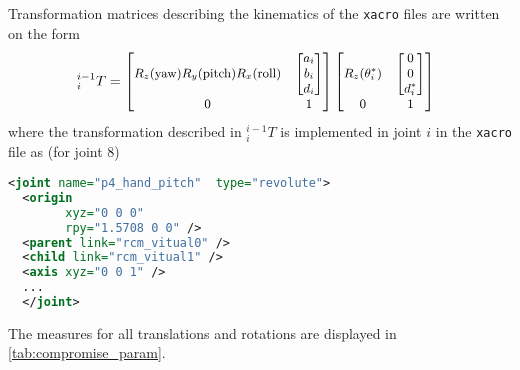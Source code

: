 Transformation matrices describing the kinematics of the \texttt{xacro} files are written on the form
\begin{equation}
\hspace*{-2mm}
\small
^{i-1}_i T =
\begin{bmatrix}
R_z(\text{yaw})R_y(\text{pitch})R_x(\text{roll}) & \begin{bmatrix}a_i\\ b_i\\ d_i\end{bmatrix}\\
0 & 1
\end{bmatrix}
\begin{bmatrix}
R_z(\theta_i^*) & \begin{bmatrix}0\\ 0\\ d_i^* \end{bmatrix}\\
0 & 1
\end{bmatrix}
\label{eq:xacro_transformation}
\end{equation}
where the transformation described in $^{i-1}_i T$ is implemented in joint $i$ in the \texttt{xacro} file  as (for joint 8)
\begin{lstlisting}[language=xml]
  <joint name="p4_hand_pitch"  type="revolute">
  <origin
  		xyz="0 0 0"
  		rpy="1.5708 0 0" />
  <parent link="rcm_vitual0" />
  <child link="rcm_vitual1" />
  <axis xyz="0 0 1" />
  ...
  </joint>
\end{lstlisting}
The measures for all translations and rotations are displayed in \autoref{tab:compromise_param}.

